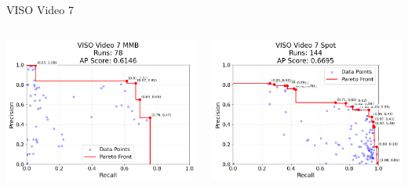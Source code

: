 \begin{frame}{VISO Video 7}
    \begin{columns}
        \begin{column}{0.48\textwidth}
            \centering
            \includegraphics[width=\textwidth,height=0.7\textheight,keepaspectratio]{images/bom/VISO_Video_7_MMB_78.png}
        \end{column}
        \begin{column}{0.48\textwidth}
            \centering
            \includegraphics[width=\textwidth,height=0.7\textheight,keepaspectratio]{images/bom/VISO_Video_7_Spot_144.png}
        \end{column}
    \end{columns}
\end{frame}